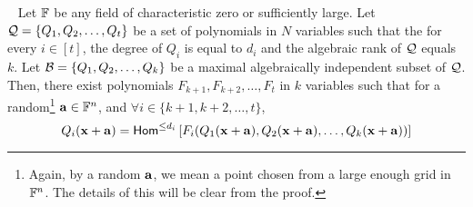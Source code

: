 \begin{lemma}~\label{lem:using algebraic dependence}
Let $\mathbb{F}$ be any  field of characteristic zero or sufficiently large. Let ${\cal Q} = \{Q_1, Q_2, \ldots, Q_t\}$ be a set of polynomials in $N$ variables such that the for every $i \in [t]$, the degree of  $Q_i$ is equal to $d_i$ and  the algebraic rank of ${\cal Q}$ equals $k$. Let  ${\cal B} = \{Q_1, Q_2, \ldots, Q_k\}$ be a maximal algebraically independent subset of ${\cal Q}$. Then, there exist polynomials $F_{k+1}, F_{k+2}, \ldots, F_{t}$  in $k$ variables such that 	for a random\footnote{Again, by a random $\mathbf{a}$, we mean a point chosen from a large enough grid in $\mathbb{F}^n$. The details of this will be clear from the proof.} $\mathbf{a} \in \mathbb{F}^n$, and $\forall i \in \{k+1, k+2, \ldots, t\}$, 
$$Q_i(\mathbf{x} + \mathbf{a}) = \mathsf{Hom}^{\leq d_i}\left[F_i(Q_1(\mathbf{x} + \mathbf{a}), Q_2(\mathbf{x} + \mathbf{a}), \ldots, Q_k(\mathbf{x} + \mathbf{a})) \right] $$
\end{lemma}
